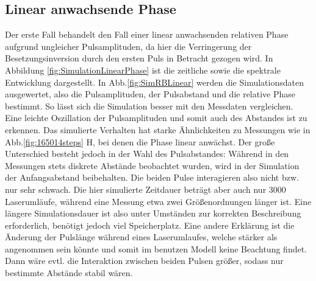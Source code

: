 \documentclass[bachelor,       %
               twoside,        %
               BCOR10mm,       %
               liststotoc,nomtotoc,bibtotoc, %
               english,ngerman, %
               final,          %
               ]{GAUBM}
\begin{document}
\clearpage
\subsection{Linear anwachsende Phase}
Der erste Fall behandelt den Fall einer linear anwachsenden relativen Phase aufgrund ungleicher Pulsamplituden, da hier die Verringerung der Besetzungsinversion durch den ersten Puls in Betracht gezogen wird.
In Abbildung \ref{fig:SimulationLinearPhase} ist die zeitliche sowie die spektrale Entwicklung dargestellt.
In Abb.\ref{fig:SimRBLinear} werden die Simulationsdaten ausgewertet, also die Pulsamplituden, der Pulsabstand und die relative Phase bestimmt.
So lässt sich die Simulation besser mit den Messdaten vergleichen.
Eine leichte Oszillation der Pulsamplituden und somit auch des Abstandes ist zu erkennen.
Das simulierte Verhalten hat starke Ähnlichkeiten zu Messungen wie in Abb.\ref{fig:165014steps} H, bei denen die Phase linear anwächst.
Der große Unterschied besteht jedoch in der Wahl des Pulsabstandes:
Während in den Messungen stets diskrete Abstände beobachtet wurden, wird in der Simulation der Anfangsabstand beibehalten.
Die beiden Pulse interagieren also nicht bzw. nur sehr schwach.
Die hier simulierte Zeitdauer beträgt aber auch nur 3000 Laserumläufe, während eine Messung etwa zwei Größenordnungen länger ist.
Eine längere Simulationsdauer ist also unter Umständen zur korrekten Beschreibung erforderlich, benötigt jedoch viel Speicherplatz.
Eine andere Erklärung ist die Änderung der Pulslänge während eines Laserumlaufes, welche stärker als angenommen sein könnte und somit im benutzen Modell keine Beachtung findet.
Dann wäre evtl. die Interaktion zwischen beiden Pulsen größer, sodass nur bestimmte Abstände stabil wären.
\end{document}
